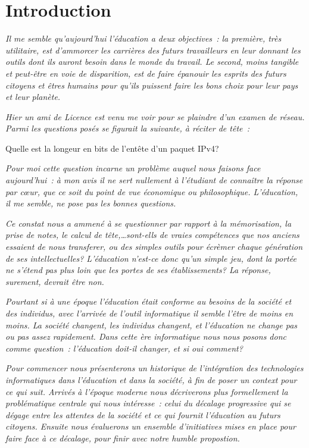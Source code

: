 
\chapter*{Introduction}\label{intro}

\textit{Il me semble qu'aujourd'hui l'éducation a deux objectives~: la première, très utilitaire, est d'ammorcer les carrières des futurs travailleurs en leur donnant les outils dont ils auront besoin dans le monde du travail. Le second, moins tangible et peut-être en voie de disparition, est de faire épanouir les esprits des futurs citoyens et êtres humains pour qu'ils puissent faire les bons choix pour leur pays et leur planète.}

\textit{Hier un ami de Licence est venu me voir pour se plaindre d'un examen de réseau. Parmi les questions posés se figurait la suivante, à réciter de tête~:}

\begin{coolquote}\Large Quelle est la longeur en bits de l'entête d'un paquet IPv4?\end{coolquote}

\textit{Pour moi cette question incarne un problème auquel nous faisons face aujourd'hui~: à mon avis il ne sert nullement à l'étudiant de connaître la réponse par c\oe{}ur, que ce soit du point de vue économique ou philosophique. L'éducation, il me semble, ne pose pas les bonnes questions.}

\textit{Ce constat nous a ammené à se questionner par rapport à la mémorisation, la prise de notes, le calcul de tête,\ldots sont-ells de vraies compétences que nos anciens essaient de nous transferer, ou des simples outils pour écrèmer chaque génération de ses intellectuelles? L'éducation n'est-ce donc qu'un simple jeu, dont la portée ne s'étend pas plus loin que les portes de ses établissements? La réponse, surement, devrait être non.}

\textit{Pourtant si à une époque l'éducation était conforme au besoins de la société et des individus, avec l'arrivée de l'outil informatique il semble l'être de moins en moins. La société changent, les individus changent, et l'éducation ne change pas ou pas assez rapidement. Dans cette ère informatique nous nous posons donc comme question~: l'éducation doit-il changer, et si oui comment?}

\textit{Pour commencer nous présenterons un historique de l'intégration des technologies informatiques dans l'éducation et dans la société, à fin de poser un context pour ce qui suit. Arrivés à l'époque moderne nous décriverons plus formellement la problématique centrale qui nous intéresse~: celui du décalage progressive qui se dégage entre les attentes de la société et ce qui fournit l'éducation au futurs citoyens. Ensuite nous évaluerons un ensemble d'initiatives mises en place pour faire face à ce décalage, pour finir avec notre humble propostion.}